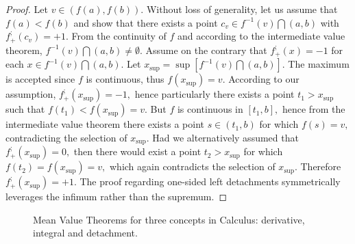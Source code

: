 \documentclass[11pt]{book}
\begin{document}
\begin{proof}Let $v\in\left(f\left(a\right),f\left(b\right)\right).$ Without loss of generality, let us assume that $f\left(a\right)<f\left(b\right)$ and show that there exists a point $c_{v}\in f^{-1}\left(v\right)\bigcap\left(a,b\right)$ with $f^{;}_{+}\left(c_v\right)=+1.$ From the continuity of $f$ and according to the intermediate value theorem, $f^{-1}\left(v\right)\bigcap\left(a,b\right)\neq\emptyset. $ Assume on the contrary that $f_{+}^{;}\left(x\right)=-1$ for each $x\in f^{-1}\left(v\right)\bigcap\left(a,b\right).$ Let $x_{\sup}=\sup\left[f^{-1}\left(v\right)\bigcap\left(a,b\right)\right].$ The maximum is accepted since $f$ is continuous, thus $f\left(x_{\sup}\right)=v.$ According to our assumption, $f_{+}^{;}\left(x_{\sup}\right)=-1,$ hence particularly there exists a point $t_{1} > x_{\sup}$ such that $f\left(t_{1}\right) < f\left(x_{\sup}\right)=v.$ But $f$ is continuous in $\left[t_{1},b\right],$ hence from the intermediate value theorem there exists a point $s\in\left(t_{1},b\right)$ for which $f\left(s\right)=v,$ contradicting the selection of $x_{\sup}.$ Had we alternatively assumed that $f_{+}^{;}\left(x_{\sup}\right)=0,$ then there would exist a point $t_{2} > x_{\sup}$ for which $f\left(t_{2}\right)=f\left(x_{\sup}\right)=v,$ which again contradicts the selection of $x_{\sup}.$ Therefore $f_{+}^{;}\left(x_{\sup}\right)=+1.$ The proof regarding one-sided left detachments symmetrically leverages the infimum rather than the supremum.
\end{proof}

\begin{figure}[htp]




\caption{Mean Value Theorems for three concepts in Calculus: derivative, integral and detachment.}

\end{figure}
\end{document}
